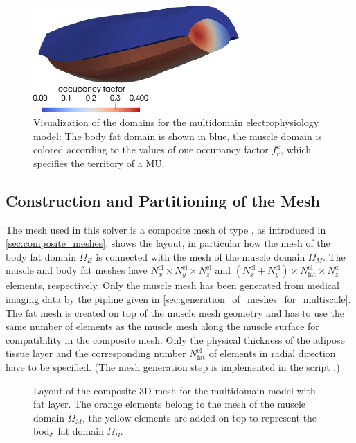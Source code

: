 \begin{figure}
  \centering
  \includegraphics[width=0.7\textwidth]{images/implementation/multidomain_mesh.png}%
  \caption{Visualization of the domains for the multidomain electrophysiology model: The body fat domain is shown in blue, the muscle domain is colored according to the values of one occupancy factor $f_r^k$, which specifies the territory of a MU.}
  \label{fig:solver_multidomain_mesh}
\end{figure}

\subsection{Construction and Partitioning of the Mesh}\label{sec:construction_and_partitioning_of_the_mesh}

The mesh used in this solver is a composite mesh of type , as introduced in \cref{sec:composite_meshes}.  shows the layout, in particular how the mesh of the body fat domain $\Omega_B$ is connected with the mesh of the muscle domain $\Omega_M$. The muscle and body fat meshes have $N_x^\text{el} \times N_y^\text{el} \times N_z^\text{el}$ and $(N_x^\text{el}+ N_y^\text{el}) \times N_\text{fat}^\text{el} \times N_z^\text{el}$ elements, respectively. Only the muscle mesh has been generated from medical imaging data by the pipline given in \cref{sec:generation_of_meshes_for_multiscale}. The fat mesh is created on top of the muscle mesh geometry and has to use the same number of elements as the muscle mesh along the muscle surface for compatibility in the composite mesh. Only the physical thickness of the adipose tissue layer and the corresponding number $N_\text{fat}^\text{el}$ of elements in radial direction have to be specified.  (The mesh generation step is implemented in the script .) 

\begin{figure}
  \centering%
  \def\svgwidth{0.6\textwidth}
  \caption{Layout of the composite 3D mesh for the multidomain model with fat layer. The orange elements belong to the mesh of the muscle domain $\Omega_M$, the yellow elements are added on top to represent the body fat domain $\Omega_B$.}%
  \label{fig:structured_grid_n_nodes}%
\end{figure}%

